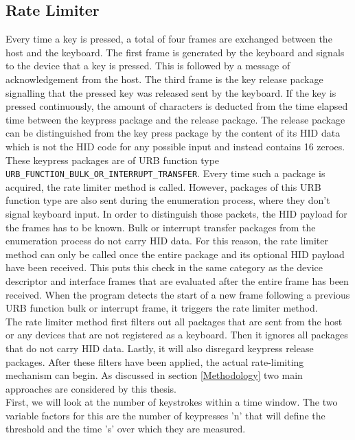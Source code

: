 \subsection{Rate Limiter}

Every time a key is pressed, a total of four frames are exchanged between the host and the keyboard. The first frame is generated by the keyboard and signals to the device that a key is pressed. This is followed by a message of acknowledgement from the host. The third frame is the key release package signalling that the pressed key was released sent by the keyboard. If the key is pressed continuously, the amount of characters is deducted from the time elapsed time between the keypress package and the release package. The release package can be distinguished from the key press package by the content of its HID data which is not the HID code for any possible input and instead contains 16 zeroes. \\
These keypress packages are of URB function type \\ \verb|URB_FUNCTION_BULK_OR_INTERRUPT_TRANSFER|. Every time such a package is acquired, the rate limiter method is called. However, packages of this URB function type are also sent during the enumeration process, where they don't signal keyboard input. In order to distinguish those packets, the HID payload for the frames has to be known. Bulk or interrupt transfer packages from the enumeration process do not carry HID data. For this reason, the rate limiter method can only be called once the entire package and its optional HID payload have been received. This puts this check in the same category as the device descriptor and interface frames that are evaluated after the entire frame has been received. When the program detects the start of a new frame following a previous URB function bulk or interrupt frame, it triggers the rate limiter method. \\
The rate limiter method first filters out all packages that are sent from the host or any devices that are not registered as a keyboard. Then it ignores all packages that do not carry HID data. Lastly, it will also disregard keypress release packages. After these filters have been applied, the actual rate-limiting mechanism can begin. As discussed in section \ref{Methodology} two main approaches are considered by this thesis. \\
First, we will look at the number of keystrokes within a time window. The two variable factors for this are the number of keypresses 'n' that will define the threshold and the time 's' over which they are measured. 
